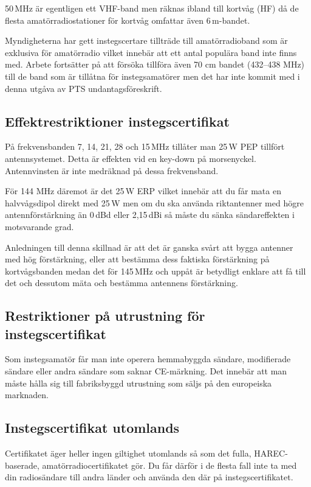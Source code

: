 50\,MHz är egentligen ett VHF-band men räknas ibland till kortvåg (HF) då de
flesta amatörradiostationer för kortvåg omfattar även 6\,m-bandet.

Myndigheterna har gett instegscertare tillträde till amatörradioband som är
exklusiva för amatörradio vilket innebär att ett antal populära band inte finns
med. Arbete fortsätter på att försöka tillföra även 70 cm bandet (432--438 MHz)
till de band som är tillåtna för instegsamatörer men det har inte kommit med i
denna utgåva av PTS undantagsföreskrift.

\subsection{Effektrestriktioner instegscertifikat}

På frekvensbanden 7, 14, 21, 28 och 15\,MHz tillåter man 25\,W PEP tillfört
antennsystemet. Detta är effekten vid en key-down på morsenyckel. Antennvinsten
är inte medräknad på dessa frekvensband.

För 144 MHz däremot är det 25\,W ERP vilket innebär att du får mata en
halvvågsdipol direkt med 25\,W men om du ska använda riktantenner med högre
antennförstärkning än 0\,dBd eller 2,15\,dBi så måste du sänka sändareffekten i
motsvarande grad.

Anledningen till denna skillnad är att det är ganska svårt att bygga antenner
med hög förstärkning, eller att bestämma dess faktiska förstärkning på
kortvågsbanden medan det för 145\,MHz och uppåt är betydligt enklare att få till
det och dessutom mäta och bestämma antennens förstärkning.

\subsection{Restriktioner på utrustning för instegscertifikat}

Som instegsamatör får man inte operera hemmabyggda sändare, modifierade sändare
eller andra sändare som saknar CE-märkning. Det innebär att man måste hålla sig
till fabriksbyggd utrustning som säljs på den europeiska marknaden.

\subsection{Instegscertifikat utomlands}

Certifikatet äger heller ingen giltighet utomlands så som det fulla,
HAREC-baserade, amatörradiocertifikatet gör. Du får därför i de flesta fall inte
ta med din radiosändare till andra länder och använda den där på
instegscertifikatet.

